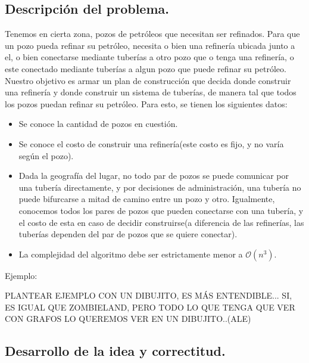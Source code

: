 \subsection{Descripción del problema.}

\vspace*{0.3cm}

Tenemos en cierta zona, pozos de petróleos que necesitan ser refinados. Para que un pozo pueda refinar su petróleo, necesita o bien una refinería ubicada junto a el, o bien conectarse mediante tuberías a otro pozo que o tenga una refinería, o este conectado mediante tuberías a algun pozo que puede refinar su petróleo. Nuestro objetivo es armar un plan de construcción que decida donde construir una refinería y donde construir un sistema de tuberías, de manera tal que todos los pozos puedan refinar su petróleo. Para esto, se tienen los siguientes datos:

\begin{itemize}

	\item Se conoce la cantidad de pozos en cuestión.
	\item Se conoce el costo de construir una refinería(este costo es fijo, y no varía según el pozo).
	\item Dada la geografía del lugar, no todo par de pozos se puede comunicar por una tubería directamente, y por decisiones de administración, una tubería no puede bifurcarse a mitad de camino entre un pozo y otro. Igualmente, conocemos todos los pares de pozos que pueden conectarse con una tubería, y el costo de esta en caso de decidir construirse(a diferencia de las refinerías, las tuberías dependen del par de pozos que se quiere conectar).
	\item La complejidad del algoritmo debe ser estrictamente menor a $\mathcal{O}(n^3)$.
	
	
\end{itemize}

Ejemplo:

PLANTEAR EJEMPLO CON UN DIBUJITO, ES MÁS ENTENDIBLE... SI, ES IGUAL QUE ZOMBIELAND, PERO TODO LO QUE TENGA QUE VER CON GRAFOS LO QUEREMOS VER EN UN DIBUJITO..(ALE)

\vspace*{0.6cm}

\subsection{Desarrollo de la idea y correctitud.}




